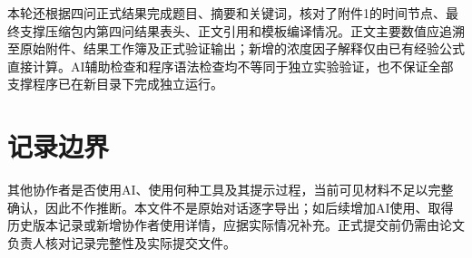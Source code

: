 \documentclass[UTF8,fontset=fandol,11pt]{ctexart}
\begin{document}
本轮还根据四问正式结果完成题目、摘要和关键词，核对了附件1的时间节点、最终支撑压缩包内第四问结果表头、正文引用和模板编译情况。正文主要数值应追溯至原始附件、结果工作簿及正式验证输出；新增的浓度因子解释仅由已有经验公式直接计算。AI辅助检查和程序语法检查均不等同于独立实验验证，也不保证全部支撑程序已在新目录下完成独立运行。

\section{记录边界}
其他协作者是否使用AI、使用何种工具及其提示过程，当前可见材料不足以完整确认，因此不作推断。本文件不是原始对话逐字导出；如后续增加AI使用、取得历史版本记录或新增协作者使用详情，应据实际情况补充。正式提交前仍需由论文负责人核对记录完整性及实际提交文件。
\end{document}
